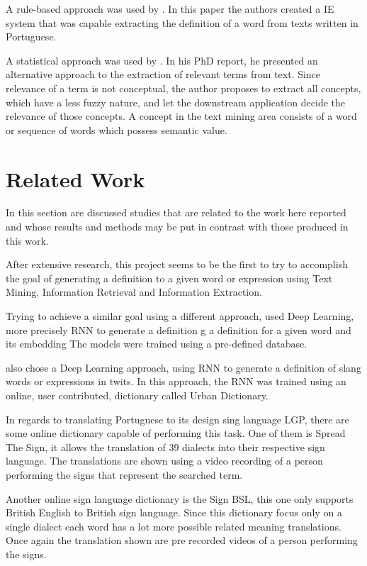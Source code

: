 A rule-based approach was used by \textcite{gaudio_2007}.
In this paper the authors created a IE system that was capable extracting the definition of a word from texts written in Portuguese.

A statistical approach was used by \textcite{ventura_2014}.
In his PhD report, he presented an alternative approach to the extraction of relevant terms from text.
Since relevance of a term is not conceptual, the author proposes to extract all concepts, which have a less fuzzy nature, and let the downstream application decide the relevance of those concepts.
A concept in the text mining area consists of a word or sequence of words which possess semantic value.

\section{Related Work}

In this section are discussed studies that are related to the work here reported and whose results and methods may be put in contrast with those produced in this work.

After extensive research, this project seems to be the first to try to accomplish the goal of generating a definition to a given word or expression using Text Mining, Information Retrieval and Information Extraction.

Trying to achieve a similar goal using a different approach, \textcite{noraset_2016} used Deep Learning, more precisely \gls{RNN} to generate a definition g a definition for a given word and its embedding
The models were trained using a pre-defined database.

\textcite{ni_2017} also chose a Deep Learning approach, using \gls{RNN} to generate a definition of slang words or expressions in twits.
In this approach, the \gls{RNN} was trained using an online, user contributed, dictionary called Urban Dictionary.

In regards to translating Portuguese to its design sing language \gls{LGP}, there are some online dictionary capable of performing this task.
One of them is Spread The Sign, it allows the translation of 39 dialects into their respective sign language.
The translations are shown using a video recording of a person performing the signs that represent the searched term.

Another online sign language dictionary is the Sign BSL, this one only supports British English to British sign language.
Since this dictionary focus only on a single dialect each word has a lot more possible related meaning translations.
Once again the translation shown are pre recorded videos of a person performing the signs.

